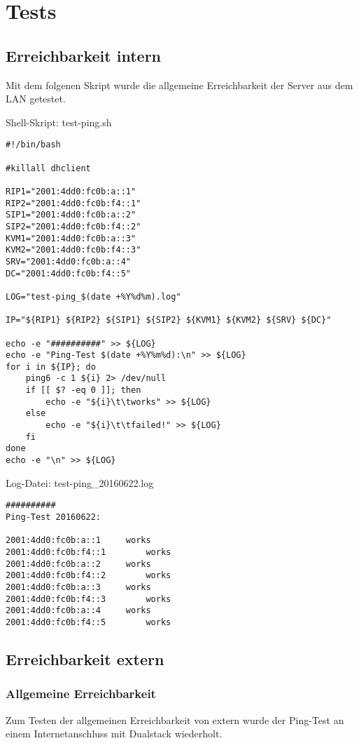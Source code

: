 \section{Tests}

\subsection{Erreichbarkeit intern}

Mit dem folgenen Skript wurde die allgemeine Erreichbarkeit der Server aus dem LAN getestet.

Shell-Skript: {\sc test-ping.sh}
\begin{lstlisting}
#!/bin/bash

#killall dhclient

RIP1="2001:4dd0:fc0b:a::1"
RIP2="2001:4dd0:fc0b:f4::1"
SIP1="2001:4dd0:fc0b:a::2"
SIP2="2001:4dd0:fc0b:f4::2"
KVM1="2001:4dd0:fc0b:a::3"
KVM2="2001:4dd0:fc0b:f4::3"
SRV="2001:4dd0:fc0b:a::4"
DC="2001:4dd0:fc0b:f4::5"

LOG="test-ping_$(date +%Y%d%m).log"

IP="${RIP1} ${RIP2} ${SIP1} ${SIP2} ${KVM1} ${KVM2} ${SRV} ${DC}"

echo -e "##########" >> ${LOG}
echo -e "Ping-Test $(date +%Y%m%d):\n" >> ${LOG}
for i in ${IP}; do
	ping6 -c 1 ${i} 2> /dev/null
	if [[ $? -eq 0 ]]; then
		echo -e "${i}\t\tworks" >> ${LOG}
	else
		echo -e "${i}\t\tfailed!" >> ${LOG}
	fi
done	
echo -e "\n" >> ${LOG}
\end{lstlisting}

Log-Datei: {\sc test-ping\_20160622.log}
\begin{lstlisting}
##########
Ping-Test 20160622:

2001:4dd0:fc0b:a::1		works
2001:4dd0:fc0b:f4::1		works
2001:4dd0:fc0b:a::2		works
2001:4dd0:fc0b:f4::2		works
2001:4dd0:fc0b:a::3		works
2001:4dd0:fc0b:f4::3		works
2001:4dd0:fc0b:a::4		works
2001:4dd0:fc0b:f4::5		works
\end{lstlisting}

\subsection{Erreichbarkeit extern}

\subsubsection{Allgemeine Erreichbarkeit}

Zum Testen der allgemeinen Erreichbarkeit von extern wurde der Ping-Test an einem Internetanschluss mit Dualstack wiederholt.

